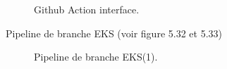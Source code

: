 {\begin{figure}[H]
\begin{center}
       \end{center}
       \caption{Github Action interface.}
      \end{figure}
       Pipeline de branche EKS (voir figure 5.32 et 5.33)
      \begin{figure}[H]
        \begin{center}
        \end{center}
        \caption{Pipeline de branche EKS(1).}
       \end{figure}
         \begin{figure}[H]
        \begin{center}

\end{center}
\end{figure}}
